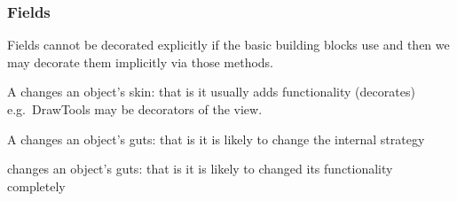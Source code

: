 \subsubsection{Fields}
\label{subsubsec:Fields}
\begin{sectionbox}\nospacing
 Fields cannot be decorated explicitly  if the basic building blocks
 use  and  then we may decorate them
 implicitly via those methods.
\end{sectionbox}
\begin{notebox}\nospacing
  \begin{itemizenosep}
      \item A  changes an object’s skin: that is it
    usually adds functionality (decorates) e.g.\ DrawTools may be decorators of
    the view.
      \item A  changes an object’s guts: that is it is
      likely to change the internal strategy
      \item {} changes an object’s guts: that is it is
      likely to changed its functionality completely 
  \end{itemizenosep}
\end{notebox}
